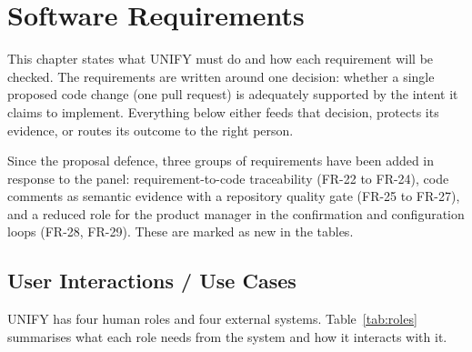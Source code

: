 \chapter{Software Requirements}
\label{ch:requirements}

This chapter states what UNIFY must do and how each requirement will be
checked. The requirements are written around one decision: whether a single
proposed code change (one pull request) is adequately supported by the intent
it claims to implement. Everything below either feeds that decision, protects
its evidence, or routes its outcome to the right person.

Since the proposal defence, three groups of requirements have been added in
response to the panel: requirement-to-code traceability
(FR-22 to FR-24), code comments as semantic evidence with a repository quality
gate (FR-25 to FR-27), and a reduced role for the product manager in the
confirmation and configuration loops (FR-28, FR-29). These are marked as new in
the tables.

\section{User Interactions / Use Cases}
\label{sec:user-interactions}

UNIFY has four human roles and four external systems. Table~\ref{tab:roles}
summarises what each role needs from the system and how it interacts with it.

